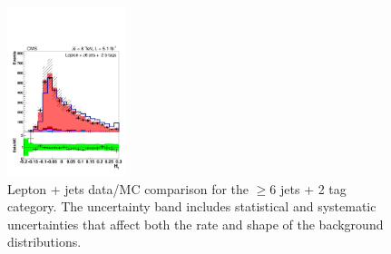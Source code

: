 \begin{figure}[hbtp]
\begin{center}
   \includegraphics[width=0.31\textwidth]{Figures/Analysis_1_Diagrams/d2MCPlots_h1_cut3_jge6_t2_Combined_HtWgt.pdf}
   \hspace{0.055\textwidth}
   \caption{Lepton + jets data/MC comparison for the $\ge$6 jets + 2 tag category.  The uncertainty band includes statistical and systematic uncertainties that affect both the rate and shape of the background distributions.}
   \label{fig:lj_input_6j_2t_part1}
   \hspace{0.055\textwidth}
 \end{center}
\end{figure}

\clearpage

